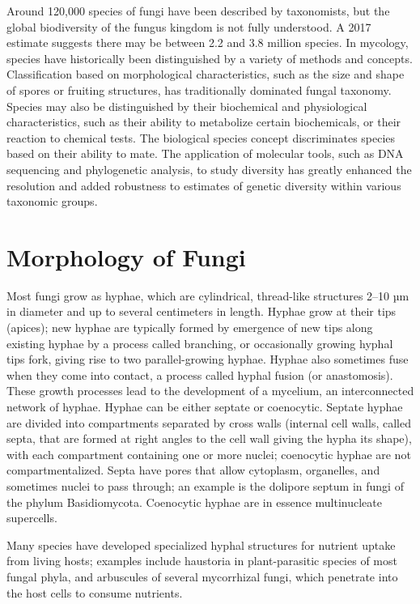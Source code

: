Around 120,000 species of fungi have been described by taxonomists, but the global biodiversity of the fungus kingdom is not fully understood. A 2017 estimate suggests there may be between 2.2 and 3.8 million species. In mycology, species have historically been distinguished by a variety of methods and concepts. Classification based on morphological characteristics, such as the size and shape of spores or fruiting structures, has traditionally dominated fungal taxonomy. Species may also be distinguished by their biochemical and physiological characteristics, such as their ability to metabolize certain biochemicals, or their reaction to chemical tests. The biological species concept discriminates species based on their ability to mate. The application of molecular tools, such as DNA sequencing and phylogenetic analysis, to study diversity has greatly enhanced the resolution and added robustness to estimates of genetic diversity within various taxonomic groups.

\hypertarget{morphology-of-fungi}{%
\section{Morphology of Fungi}\label{morphology-of-fungi}}

Most fungi grow as hyphae, which are cylindrical, thread-like structures 2--10 µm in diameter and up to several centimeters in length. Hyphae grow at their tips (apices); new hyphae are typically formed by emergence of new tips along existing hyphae by a process called branching, or occasionally growing hyphal tips fork, giving rise to two parallel-growing hyphae. Hyphae also sometimes fuse when they come into contact, a process called hyphal fusion (or anastomosis). These growth processes lead to the development of a mycelium, an interconnected network of hyphae. Hyphae can be either septate or coenocytic. Septate hyphae are divided into compartments separated by cross walls (internal cell walls, called septa, that are formed at right angles to the cell wall giving the hypha its shape), with each compartment containing one or more nuclei; coenocytic hyphae are not compartmentalized. Septa have pores that allow cytoplasm, organelles, and sometimes nuclei to pass through; an example is the dolipore septum in fungi of the phylum Basidiomycota. Coenocytic hyphae are in essence multinucleate supercells.

Many species have developed specialized hyphal structures for nutrient uptake from living hosts; examples include haustoria in plant-parasitic species of most fungal phyla, and arbuscules of several mycorrhizal fungi, which penetrate into the host cells to consume nutrients.

